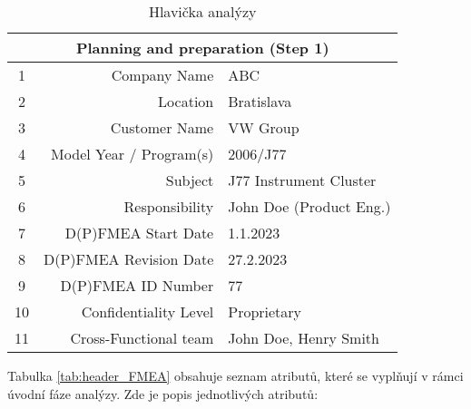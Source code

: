 \begin{center}
\begin{table}[h]
	\centering
	\caption{Hlavička analýzy}
 \label{tab:header_FMEA}
	\label{tab:Head1}
        \begin{tabular}{|c | r | l |} 
         \hline
 \multicolumn{3}{|c|}{Planning and preparation (Step 1)} \\

         \hline
         1 & Company Name & ABC  \\ [0.5ex] 
         \hline
         2 & Location & Bratislava  \\ [0.5ex] 
         \hline
         3 & Customer Name & VW Group  \\ [0.5ex] 
         \hline
         4 & Model Year / Program(s) & 2006/J77 \\ [0.5ex] 
         \hline
         5 & Subject & J77 Instrument Cluster \\ [0.5ex] 
         \hline
         6 & Responsibility & John Doe (Product Eng.) \\ [0.5ex] 
         \hline
         7 & D(P)FMEA Start Date & 1.1.2023  \\ [0.5ex] 
         \hline
         8 & D(P)FMEA Revision Date & 27.2.2023 \\ [0.5ex] 
         \hline
         9 & D(P)FMEA ID Number & 77 \\ [0.5ex] 
         \hline
         10 & Confidentiality Level & Proprietary \\ [0.5ex] 
         \hline
         11 & Cross-Functional team & John Doe, Henry Smith \\ [0.5ex] 
         \hline
        \end{tabular}
    \end{table}
\end{center}

Tabulka \ref{tab:header_FMEA} obsahuje seznam atributů, které se vyplňují v rámci úvodní fáze analýzy. Zde je popis jednotlivých atributů:

